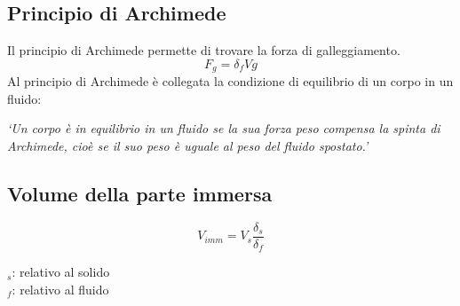 \subsection{Principio di Archimede}
Il principio di Archimede permette di trovare la forza di galleggiamento.
\begin{equation*}
F_g = \delta_fVg
\end{equation*}
Al principio di Archimede è collegata la condizione di equilibrio di un corpo in un fluido:\\
\begin{center}
	\emph{`Un corpo è in equilibrio in un fluido se la sua forza peso compensa la spinta di 
		Archimede, cioè se il suo peso è uguale al peso del fluido spostato.'}
\end{center}

\subsection{Volume della parte immersa}
\begin{equation*}
V_{imm} = V_s\frac{\delta_s}{\delta_f}
\end{equation*}
\begin{center}
\end{center}

$_s$: relativo al solido\\
$_f$: relativo al fluido
